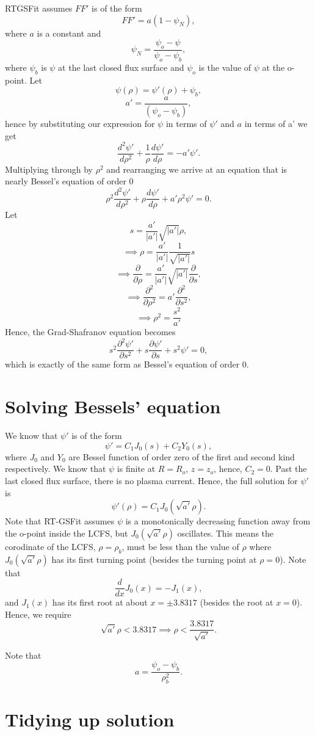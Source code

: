 \documentclass{article}
\begin{document}
RTGSFit assumes $FF'$ is of the form
\[FF' = a(1-\psi_N),\]
where $a$ is a constant and
\[\psi_N = \frac{\psi_o-\psi}{\psi_o-\psi_b},\]
where $\psi_b$ is $\psi$ at the last closed flux surface and $\psi_o$ is the value of $\psi$ at the o-point.
Let
\[\psi(\rho)=\psi'(\rho)+\psi_b,\]
\[a'=\frac{a}{(\psi_o - \psi_b)},\]
hence by substituting our expression for $\psi$ in terms of $\psi'$ and $a$ in terms of a' we get
\[\frac{d^2\psi'}{d \rho^2} + \frac{1}{\rho}\frac{d \psi'}{d \rho} = -a'\psi'.\]
Multiplying through by $\rho^2$ and rearranging we arrive at an equation that is nearly Bessel's equation of order 0
\[\rho^2\frac{d^2\psi'}{d \rho^2} + \rho\frac{d \psi'}{d \rho} + a'\rho^2\psi'= 0.\]
Let 
\[s=\frac{a'}{|a'|}\sqrt{|a'|}\rho,\]
\[\implies \rho=\frac{a'}{|a'|}\frac{1}{\sqrt{|a'|}}s\]
\[\implies \frac{\partial }{\partial \rho} =\frac{a'}{|a'|}\sqrt{|a'|}\frac{\partial }{\partial s},\]
\[\implies \frac{\partial^2 }{\partial \rho^2} =a'\frac{\partial^2 }{\partial s^2},\]
\[\implies \rho^2 = \frac{s^2}{a'}\]
Hence, the Grad-Shafranov equation becomes
\[s^2\frac{\partial^2\psi'}{\partial s^2} + s\frac{\partial \psi'}{\partial s} + s^2\psi'= 0,\]
which is exactly of the same form as Bessel's equation of order 0.

\section{Solving Bessels' equation}

We know that $\psi'$ is of the form
\[\psi' = C_1J_0(s) + C_2Y_0(s),\]
where $J_0$ and $Y_0$ are Bessel function of order zero of the first and second kind respectively. We know that $\psi$ is finite at $R=R_o$, $z=z_o$, hence, $C_2=0$.
Past the last closed flux surface, there is no plasma current. 
Hence, the full solution for $\psi'$ is
\[\psi'(\rho) = C_1J_0(\sqrt{a'}\rho).\]
Note that RT-GSFit assumes $\psi$ is a monotonically decreasing function away from the o-point inside the LCFS, but $J_0(\sqrt{a'}\rho)$ oscillates. This means the corodinate of the LCFS, $\rho=\rho_b$, must be less than the value of $\rho$ where $J_0(\sqrt{a'}\rho)$ has its first turning point (besides the turning point at $\rho=0$). Note that
\[\frac{d }{d x}J_0(x) = -J_1(x),\]
and $J_1(x)$ has its first root at about $x=\pm3.8317$ (besides the root at $x=0$). Hence, we require
\[\sqrt{a'}\rho < 3.8317 \implies \rho < \frac{3.8317}{\sqrt{a'}}.\]

Note that
\[a = \frac{\psi_o-\psi_b}{\rho_b^2}.\]

\section{Tidying up solution}
\end{document}
